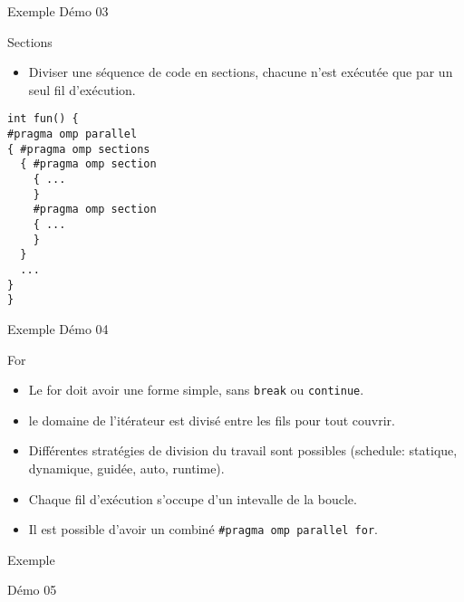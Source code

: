 \documentclass[10pt]{beamer}
\begin{document}
\begin{frame}[fragile]{Exemple}
Démo 03
\end{frame}

\begin{frame}{Sections}

  \begin{itemize}
    \item Diviser une séquence de code en sections, chacune n'est exécutée que par un seul fil d'exécution.
  \end{itemize}
  \begin{verbatim}
int fun() {
#pragma omp parallel
{ #pragma omp sections
  { #pragma omp section
    { ...
    }
    #pragma omp section
    { ...
    }
  }
  ...
}
}
  \end{verbatim}
\end{frame}

\begin{frame}[fragile]{Exemple}
Démo 04
\end{frame}

\begin{frame}[fragile]{For}

  \begin{itemize}
    \item Le for doit avoir une forme simple, sans \texttt{break} ou \texttt{continue}.

    \item le domaine de l'itérateur est divisé entre les fils pour tout couvrir.

    \item Différentes stratégies de division du travail sont possibles (schedule: statique, dynamique, guidée, auto, runtime).

    \item Chaque fil d'exécution s'occupe d'un intevalle de la boucle.

    \item Il est possible d'avoir un combiné \texttt{\#pragma omp parallel for}.
  \end{itemize}
\end{frame}

\begin{frame}[fragile]{Exemple}

Démo 05

\end{frame}
\end{document}
